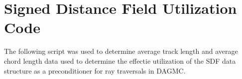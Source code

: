 
\chapter{Signed Distance Field Utilization Code}\label{ch:appendix-b}

The following script was used to determine average track length and average
chord length data used to determine the effectie utilization of the SDF data
structure as a preconditioner for ray traversals in DAGMC.

